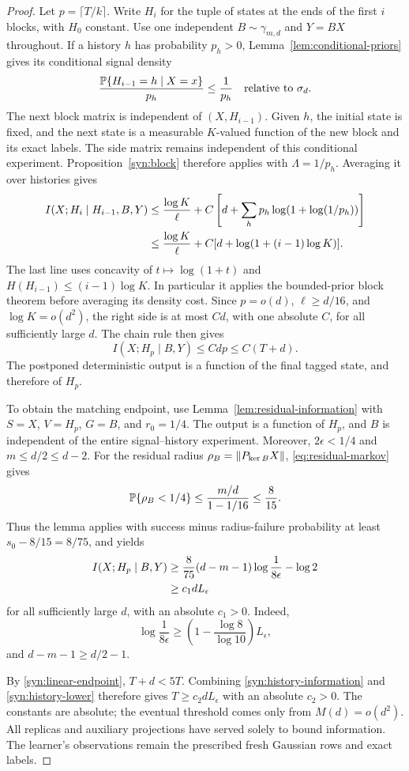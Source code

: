 \begin{proof}
Let \(p=\lceil T/k\rceil\).  Write \(H_i\) for the tuple of states at the
ends of the first \(i\) blocks, with \(H_0\) constant.  Use one independent
\(B\sim\gamma_{m,d}\) and \(Y=BX\) throughout.  If a history
\(h\) has probability \(p_h>0\), Lemma~\ref{lem:conditional-priors}
gives its conditional signal density
\[
 \frac{\mathbb P\{H_{i-1}=h\mid X=x\}}{p_h}\le\frac1{p_h}
 \quad\text{relative to }\sigma_d.
\]
The next block matrix is independent of \((X,H_{i-1})\).  Given \(h\),
the initial state is fixed, and the next state is a measurable \(K\)-valued
function of the new block and its exact labels.  The side matrix remains
independent of this conditional experiment.  Proposition~\ref{syn:block}
therefore applies with \(\Lambda=1/p_h\).  Averaging it over histories gives
\begin{align}
 I(X;H_i\mid H_{i-1},B,Y)
 &\le\frac{\log K}{\ell}
   +C\left[d+\sum_h p_h\log(1+\log(1/p_h))\right] \notag\\
 &\le\frac{\log K}{\ell}
   +C[d+\log(1+(i-1)\log K)].
 \label{syn:history-step}
\end{align}
The last line uses concavity of \(t\mapsto\log(1+t)\) and
\(H(H_{i-1})\le(i-1)\log K\).  In particular it applies the bounded-prior
block theorem before averaging its density cost.  Since
\(p=o(d)\), \(\ell\ge d/16\), and \(\log K=o(d^2)\), the right side is
at most \(Cd\), with one absolute \(C\), for all sufficiently large \(d\).
The chain rule then gives
\begin{equation}\label{syn:history-information}
 I(X;H_p\mid B,Y)\le Cdp\le C(T+d).
\end{equation}
The postponed deterministic output is a function of the final tagged state,
and therefore of \(H_p\).

To obtain the matching endpoint, use Lemma~\ref{lem:residual-information}
with \(S=X\), \(V=H_p\), \(G=B\), and \(r_0=1/4\).
The output is a function of \(H_p\), and \(B\) is independent of the
entire signal--history experiment.  Moreover, \(2\epsilon<1/4\) and
\(m\le d/2\le d-2\).  For the residual radius
\(\rho_B=\lVert P_{\ker B}X\rVert\), \eqref{eq:residual-markov} gives
\[
 \mathbb P\{\rho_B<1/4\}
 \le\frac{m/d}{1-1/16}\le\frac8{15}.
\]
Thus the lemma applies with success minus radius-failure probability at
least \(s_0-8/15=8/75\), and yields
\begin{align}
 I(X;H_p\mid B,Y)
 &\ge\frac8{75}(d-m-1)\log\frac1{8\epsilon}-\log2 \notag\\
 &\ge c_1dL_\epsilon
 \label{syn:history-lower}
\end{align}
for all sufficiently large \(d\), with an absolute \(c_1>0\).  Indeed,
\[
 \log\frac1{8\epsilon}
 \ge\left(1-\frac{\log8}{\log10}\right)L_\epsilon,
\]
and \(d-m-1\ge d/2-1\).

By \eqref{syn:linear-endpoint}, \(T+d<5T\).  Combining
\eqref{syn:history-information} and \eqref{syn:history-lower} therefore
gives \(T\ge c_2dL_\epsilon\) with an absolute \(c_2>0\).  The constants
are absolute; the eventual threshold comes only from \(M(d)=o(d^2)\).
All replicas and auxiliary projections have served solely to bound
information.  The learner's observations remain the prescribed fresh
Gaussian rows and exact labels.
\end{proof}
